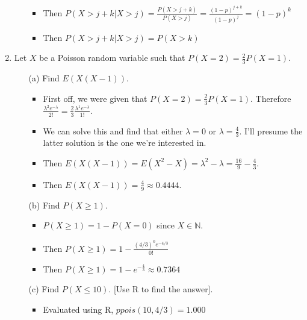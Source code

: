 \documentclass{article}
\begin{document}
\begin{enumerate}
\begin{enumerate}
\begin{itemize}
        \item Then $P(X > j + k | X > j) = \frac{P(X > j + k)}{P(X > j)} = \frac{(1 - p)^{j + k}}{(1 - p)^{j}} = (1 - p)^k$
        \item Then $P(X > j + k | X > j) = P(X > k)$
        \end{itemize}
    \end{enumerate}
\item Let $X$ be a Poisson random variable such that $P(X=2)=\frac{2}{3}P(X=1)$.
    \begin{enumerate}
    \item [(a)] Find $E(X(X-1))$.
        \begin{itemize}
        \item First off, we were given that $P(X=2)=\frac{2}{3}P(X=1)$. Therefore $\frac{\lambda^2 e^{-\lambda}}{2!}=\frac{2}{3}\frac{\lambda^1 e^{-\lambda}}{1!}$.
        \item We can solve this and find that either $\lambda = 0$ or $\lambda = \frac{4}{3}$. I'll presume the latter solution is the one we're interested in.
        \item Then $E(X(X-1)) = E(X^2 - X) = \lambda^2 - \lambda = \frac{16}{9} - \frac{4}{3}$.
        \item Then $E(X(X-1)) = \frac{4}{9} \approx 0.4444$.
        \end{itemize}
    \item [(b)] Find $P(X \ge 1)$.
        \begin{itemize}
        \item $P(X \ge 1) = 1 - P(X = 0)$ since $X \in \mathbb{N}$.
        \item Then $P(X \ge 1) = 1 - \frac{(4/3)^0 e^{-4/3}}{0!}$
        \item Then $P(X \ge 1) = 1 - e^{-\frac{4}{3}} \approx 0.7364$
        \end{itemize}
    \item [(c)] Find $P(X \le 10)$. [Use R to find the answer].
        \begin{itemize}
        \item Evaluated using R, $ppois(10, 4/3) = 1.000$
        \end{itemize}
    \end{enumerate}


\end{enumerate}
\end{document}
